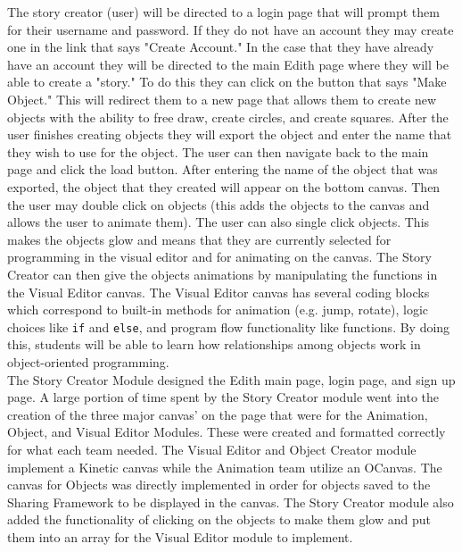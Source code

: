 \documentclass[12pt]{article}
\begin{document}
The story creator (user) will be directed to a login page that will prompt them for their username and password. If they do not have an account they may create one in the link that says "Create Account."  In the case that they have already have an account they will be directed to the main Edith page where they will be able to create a "story." To do this they can click on the button that says "Make Object." This will redirect them to a new page that allows them to create new objects with the ability to free draw, create circles, and create squares. After the user finishes creating objects they will export the object and enter the name that they wish to use for the object. The user can then navigate back to the main page and click the load button. After entering the name of the object that was exported, the object that they created will appear on the bottom canvas. Then the user may double click on objects (this adds the objects to the canvas and allows the user to animate them). The user can also single click objects. This makes the objects glow and means that they are currently selected for programming in the visual editor and for animating on the canvas. The Story Creator can then give the objects animations by manipulating the functions in the Visual Editor canvas. The Visual Editor canvas has several coding blocks which correspond to built-in methods for animation (e.g. jump, rotate), logic choices like \texttt{if} and \texttt{else}, and program flow functionality like functions. By doing this, students will be able to learn how relationships among objects work in object-oriented programming. \\

The Story Creator Module designed the Edith main page, login page, and sign up page. A large portion of time spent by the Story Creator module went into the creation of the three major canvas' on the page that were for the Animation, Object, and Visual Editor Modules.  These were created and formatted correctly for what each team needed. The Visual Editor and Object Creator module implement a Kinetic canvas while the Animation team utilize an OCanvas. The canvas for Objects was directly implemented in order for objects saved to the Sharing Framework to be displayed in the canvas. The Story Creator module also added the functionality of clicking on the objects to make them glow and put them into an array for the Visual Editor module to implement.   


\end{document}
